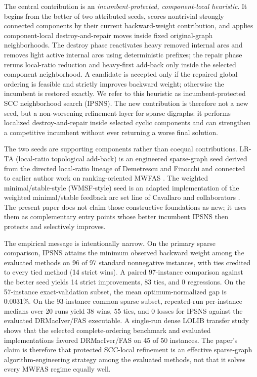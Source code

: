 The central contribution is an \emph{incumbent-protected, component-local heuristic}. It begins from the better of two attributed seeds, scores nontrivial strongly connected components by their current backward-weight contribution, and applies component-local destroy-and-repair moves inside fixed original-graph neighborhoods. The destroy phase reactivates heavy removed internal arcs and removes light active internal arcs using deterministic prefixes; the repair phase reruns local-ratio reduction and heavy-first add-back only inside the selected component neighborhood. A candidate is accepted only if the repaired global ordering is feasible and strictly improves backward weight; otherwise the incumbent is restored exactly. We refer to this heuristic as incumbent-protected SCC neighborhood search (IPSNS). The new contribution is therefore not a new seed, but a non-worsening refinement layer for sparse digraphs: it performs localized destroy-and-repair inside selected cyclic components and can strengthen a competitive incumbent without ever returning a worse final solution.

The two seeds are supporting components rather than coequal contributions. LR-TA (local-ratio topological add-back) is an engineered sparse-graph seed derived from the directed local-ratio lineage of Demetrescu and Finocchi \cite{DF03} and connected to earlier author work on ranking-oriented MWFAS \cite{VahidiKoutis2024arxiv}. The weighted minimal/stable-style (WMSF-style) seed is an adapted implementation of the weighted minimal/stable feedback arc set line of Cavallaro and collaborators \cite{CCP23CEUR,CCP24,CC25}. The present paper does not claim those constructive foundations as new; it uses them as complementary entry points whose better incumbent IPSNS then protects and selectively improves.

The empirical message is intentionally narrow. On the primary sparse comparison, IPSNS attains the minimum observed backward weight among the evaluated methods on 96 of 97 standard nonnegative instances, with ties credited to every tied method (14 strict wins). A paired 97-instance comparison against the better seed yields 14 strict improvements, 83 ties, and 0 regressions. On the 57-instance exact-validation subset, the mean optimum-normalized gap is 0.0031\%. On the 93-instance common sparse subset, repeated-run per-instance medians over 20 runs yield 38 wins, 55 ties, and 0 losses for IPSNS against the evaluated DRMacIver/FAS executable. A single-run dense LOLIB transfer study shows that the selected complete-ordering benchmark and evaluated implementations favored DRMacIver/FAS on 45 of 50 instances. The paper's claim is therefore that protected SCC-local refinement is an effective sparse-graph algorithm-engineering strategy among the evaluated methods, not that it solves every MWFAS regime equally well.

